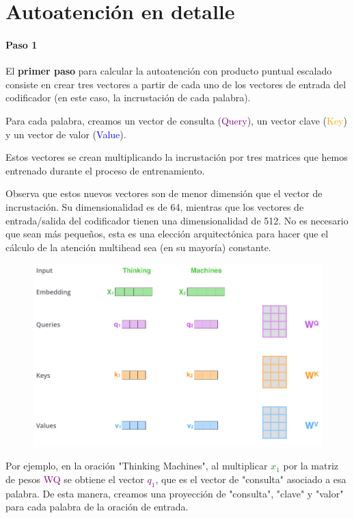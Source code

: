 \section{Autoatención en detalle}


\paragraph{Paso 1}

El \textbf{primer paso} para calcular la autoatención con producto puntual escalado consiste en crear tres vectores a partir de cada uno de los vectores de entrada del codificador (en este caso, la incrustación de cada palabra).

Para cada palabra, creamos un vector de consulta (\textcolor{purple}{Query}), un vector clave (\textcolor{orange}{Key}) y un vector de valor (\textcolor{blue}{Value}).

Estos vectores se crean multiplicando la incrustación por tres matrices que hemos entrenado durante el proceso de entrenamiento.

Observa que estos nuevos vectores son de menor dimensión que el vector de incrustación. Su dimensionalidad es de 64, mientras que los vectores de entrada/salida del codificador tienen una dimensionalidad de 512. No es necesario que sean más pequeños, esta es una elección arquitectónica para hacer que el cálculo de la atención multihead sea (en su mayoría) constante.

\begin{figure}[h]
  \centering
  \includegraphics[scale=0.3]{pics/transformer_self_attention_vectors.png}
\end{figure}

Por ejemplo, en la oración "Thinking Machines", al multiplicar \textcolor{green}{$x_1$} por la matriz de pesos \textcolor{purple}{WQ} se obtiene el vector \textcolor{purple}{$q_1$}, que es el vector de "consulta" asociado a esa palabra. De esta manera, creamos una proyección de "consulta", "clave" y "valor" para cada palabra de la oración de entrada.

